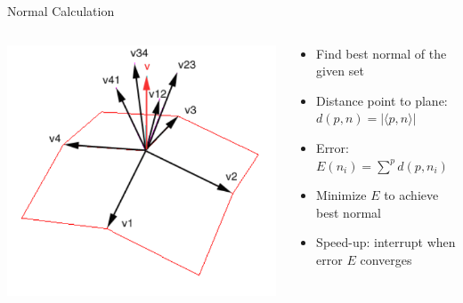 \documentclass{beamer}
\begin{document}
\begin{frame}{Normal Calculation}
	\begin{columns}
		\begin{column}{0.4\textwidth}
			\centering
			\includegraphics[width=1.0\textwidth]{normal_calculation.png}
		\end{column}
		\begin{column}{0.6\textwidth}
			\begin{itemize}
				\item Find best normal of the given set
				\item Distance point to plane: $d(p,n) = |\langle p,n \rangle|$
				\item Error: $E(n_i) = \sum\limits^{p}{d(p,n_i)}$
				\item Minimize $E$ to achieve best normal
				\item Speed-up: interrupt when error $E$ converges
			\end{itemize}
		\end{column}
	\end{columns}
\end{frame}
\end{document}
